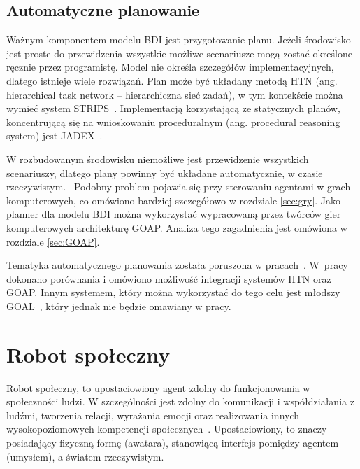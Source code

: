 \subsection{Automatyczne planowanie}
Ważnym komponentem modelu BDI jest przygotowanie planu. Jeżeli środowisko jest proste do przewidzenia wszystkie możliwe scenariusze mogą zostać określone ręcznie przez programistę. Model nie określa szczegółów implementacyjnych, dlatego istnieje wiele rozwiązań. Plan może być układany metodą HTN (ang. hierarchical task network – hierarchiczna sieć zadań), w tym kontekście można wymieć system STRIPS~\cite{FIKE}. Implementacją korzystającą ze statycznych planów, koncentrującą się na wnioskowaniu proceduralnym (ang. procedural reasoning system) jest JADEX~\cite{WALC, JADEX}. 

W rozbudowanym środowisku niemożliwe jest przewidzenie wszystkich scenariuszy, dlatego plany powinny być układane automatycznie, w czasie rzeczywistym.~\cite{SILV} Podobny problem pojawia się przy sterowaniu agentami w grach komputerowych, co omówiono bardziej szczegółowo w rozdziale \ref{sec:gry}. %
Jako planner dla modelu BDI można wykorzystać wypracowaną przez twórców gier komputerowych architekturę GOAP. Analiza tego zagadnienia jest omówiona w rozdziale \ref{sec:GOAP}. 

Tematyka automatycznego planowania została poruszona w pracach~\cite{SILV, DINI, DIGN}. W~pracy~\cite{WISS} dokonano porównania i omówiono możliwość integracji systemów HTN oraz GOAP. Innym systemem, który można wykorzystać do tego celu jest młodszy GOAL~\cite{GOAL}, który jednak nie będzie omawiany w pracy.



\section{Robot społeczny}
Robot społeczny, to upostaciowiony agent zdolny do funkcjonowania w społeczności ludzi. W szczególności jest zdolny do komunikacji i współdziałania z ludźmi, tworzenia relacji, wyrażania emocji oraz realizowania innych wysokopoziomowych kompetencji społecznych~\cite{AREN}. Upostaciowiony, to znaczy posiadający fizyczną formę (awatara), stanowiącą interfejs pomiędzy agentem (umysłem), a światem rzeczywistym. 

